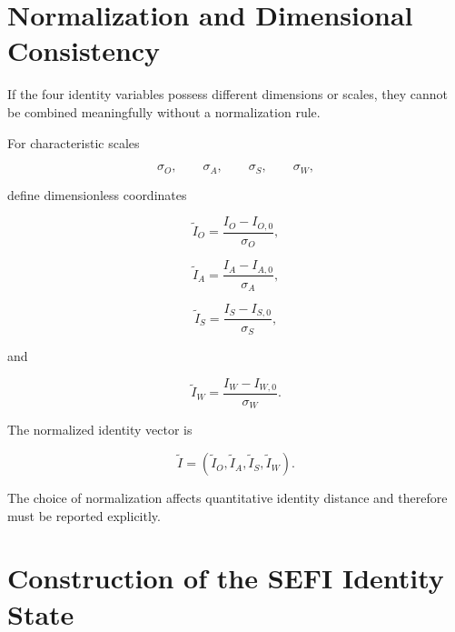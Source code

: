 \documentclass[12pt,oneside]{book}
\begin{document}
\section{Normalization and Dimensional Consistency}
\label{sec:identity-normalization}

If the four identity variables possess different dimensions or
scales, they cannot be combined meaningfully without a
normalization rule.

For characteristic scales

\begin{equation}
    \sigma_O,
    \qquad
    \sigma_A,
    \qquad
    \sigma_S,
    \qquad
    \sigma_W,
\end{equation}

define dimensionless coordinates

\begin{equation}
    \widetilde{I}_O
    =
    \frac{I_O-I_{O,0}}{\sigma_O},
\end{equation}

\begin{equation}
    \widetilde{I}_A
    =
    \frac{I_A-I_{A,0}}{\sigma_A},
\end{equation}

\begin{equation}
    \widetilde{I}_S
    =
    \frac{I_S-I_{S,0}}{\sigma_S},
\end{equation}

and

\begin{equation}
    \widetilde{I}_W
    =
    \frac{I_W-I_{W,0}}{\sigma_W}.
\end{equation}

The normalized identity vector is

\begin{equation}
    \widetilde{I}
    =
    \left(
        \widetilde{I}_O,
        \widetilde{I}_A,
        \widetilde{I}_S,
        \widetilde{I}_W
    \right).
    \label{eq:normalized-identity-vector}
\end{equation}

The choice of normalization affects quantitative identity
distance and therefore must be reported explicitly.


\section{Construction of the SEFI Identity State}
\label{sec:construction-sefi-identity}
\end{document}
